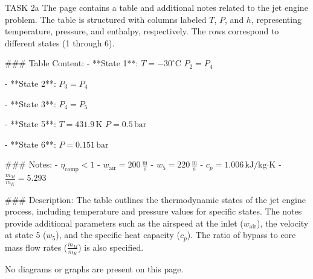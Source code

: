 TASK 2a  
The page contains a table and additional notes related to the jet engine problem. The table is structured with columns labeled \( T \), \( P \), and \( h \), representing temperature, pressure, and enthalpy, respectively. The rows correspond to different states (1 through 6).  

### Table Content:
- **State 1**:  
  \( T = -30^\circ\text{C} \)  
  \( P_2 = P_4 \)  

- **State 2**:  
  \( P_3 = P_4 \)  

- **State 3**:  
  \( P_4 = P_5 \)  

- **State 5**:  
  \( T = 431.9 \, \text{K} \)  
  \( P = 0.5 \, \text{bar} \)  

- **State 6**:  
  \( P = 0.151 \, \text{bar} \)  

### Notes:
- \( \eta_{\text{comp}} < 1 \)  
- \( w_{\text{air}} = 200 \, \frac{\text{m}}{\text{s}} \)  
- \( w_5 = 220 \, \frac{\text{m}}{\text{s}} \)  
- \( c_p = 1.006 \, \text{kJ/kg·K} \)  
- \( \frac{\dot{m}_M}{\dot{m}_K} = 5.293 \)  

### Description:
The table outlines the thermodynamic states of the jet engine process, including temperature and pressure values for specific states. The notes provide additional parameters such as the airspeed at the inlet (\( w_{\text{air}} \)), the velocity at state 5 (\( w_5 \)), and the specific heat capacity (\( c_p \)). The ratio of bypass to core mass flow rates (\( \frac{\dot{m}_M}{\dot{m}_K} \)) is also specified.  

No diagrams or graphs are present on this page.